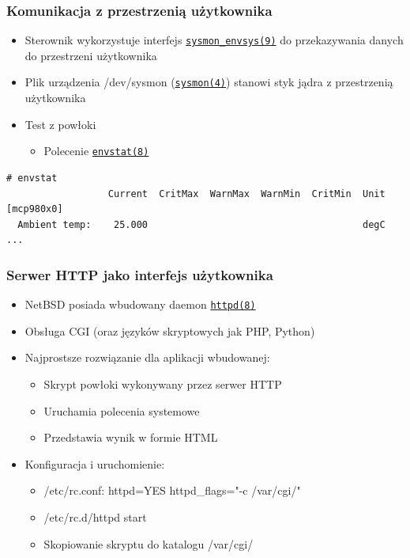 \documentclass[dvipsnames,table]{beamer}
\begin{document}
\begin{frame}[fragile]
\frametitle{Komunikacja z przestrzenią użytkownika}
\begin{itemize}
	\item Sterownik wykorzystuje interfejs {\tt \href{http://netbsd.gw.com/cgi-bin/man-cgi?sysmon_envsys+9+NetBSD-current}{sysmon\_envsys(9)}} do przekazywania danych do przestrzeni użytkownika
	\item Plik urządzenia /dev/sysmon ({\tt \href{http://netbsd.gw.com/cgi-bin/man-cgi?sysmon+4+NetBSD-current}{sysmon(4)}}) stanowi styk jądra z przestrzenią użytkownika
	\item Test z powłoki
	\begin{itemize}
		\item Polecenie {\tt \href{http://netbsd.gw.com/cgi-bin/man-cgi?envstat+8+NetBSD-current}{envstat(8)}}
	\end{itemize}
\end{itemize}
\scriptsize
\begin{verbatim}
# envstat
                  Current  CritMax  WarnMax  WarnMin  CritMin  Unit
[mcp980x0]
  Ambient temp:    25.000                                      degC
...
\end{verbatim}
\end{frame}


\begin{frame}[fragile]
\frametitle{Serwer HTTP jako interfejs użytkownika}
\begin{itemize}
	\item NetBSD posiada wbudowany daemon {\tt\href{http://netbsd.gw.com/cgi-bin/man-cgi?httpd++NetBSD-current}{httpd(8)}}
	\item Obsługa CGI (oraz języków skryptowych jak PHP, Python)	
	\item Najprostsze rozwiązanie dla aplikacji wbudowanej:
	\begin{itemize}
		\item Skrypt powłoki wykonywany przez serwer HTTP
		\item Uruchamia polecenia systemowe
		\item Przedstawia wynik w formie HTML
	\end{itemize}
	\item Konfiguracja i uruchomienie:
	\begin{itemize}
		\item /etc/rc.conf: httpd=YES httpd\_flags="-c /var/cgi/"
		\item /etc/rc.d/httpd start
		\item Skopiowanie skryptu do katalogu /var/cgi/
	\end{itemize}

\end{itemize}
\lstCGI
\end{frame}
\end{document}
